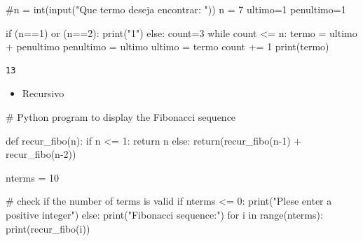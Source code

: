 \documentclass[
  letterpaper,
  DIV=11,
  numbers=noendperiod]{scrartcl}
\newenvironment{Shaded}{\begin{snugshade}}{\end{snugshade}}
\newcommand{\BuiltInTok}[1]{\textcolor[rgb]{0.00,0.23,0.31}{#1}}
\newcommand{\CommentTok}[1]{\textcolor[rgb]{0.37,0.37,0.37}{#1}}
\newcommand{\ControlFlowTok}[1]{\textcolor[rgb]{0.00,0.23,0.31}{#1}}
\newcommand{\DecValTok}[1]{\textcolor[rgb]{0.68,0.00,0.00}{#1}}
\newcommand{\KeywordTok}[1]{\textcolor[rgb]{0.00,0.23,0.31}{#1}}
\newcommand{\NormalTok}[1]{\textcolor[rgb]{0.00,0.23,0.31}{#1}}
\newcommand{\OperatorTok}[1]{\textcolor[rgb]{0.37,0.37,0.37}{#1}}
\newcommand{\StringTok}[1]{\textcolor[rgb]{0.13,0.47,0.30}{#1}}
\providecommand{\tightlist}{%
  \setlength{\itemsep}{0pt}\setlength{\parskip}{0pt}}\usepackage{longtable,booktabs,array}
\begin{document}
\begin{Shaded}
\begin{Highlighting}[]
\CommentTok{\#n = int(input("Que termo deseja encontrar: "))}
\NormalTok{n }\OperatorTok{=} \DecValTok{7}
\NormalTok{ultimo}\OperatorTok{=}\DecValTok{1}
\NormalTok{penultimo}\OperatorTok{=}\DecValTok{1}


\ControlFlowTok{if}\NormalTok{ (n}\OperatorTok{==}\DecValTok{1}\NormalTok{) }\KeywordTok{or}\NormalTok{ (n}\OperatorTok{==}\DecValTok{2}\NormalTok{):}
    \BuiltInTok{print}\NormalTok{(}\StringTok{"1"}\NormalTok{)}
\ControlFlowTok{else}\NormalTok{:}
\NormalTok{    count}\OperatorTok{=}\DecValTok{3}
    \ControlFlowTok{while}\NormalTok{ count }\OperatorTok{\textless{}=}\NormalTok{ n:}
\NormalTok{        termo }\OperatorTok{=}\NormalTok{ ultimo }\OperatorTok{+}\NormalTok{ penultimo}
\NormalTok{        penultimo }\OperatorTok{=}\NormalTok{ ultimo}
\NormalTok{        ultimo }\OperatorTok{=}\NormalTok{ termo}
\NormalTok{        count }\OperatorTok{+=} \DecValTok{1}
    \BuiltInTok{print}\NormalTok{(termo)}
\end{Highlighting}
\end{Shaded}

\begin{verbatim}
13
\end{verbatim}

\begin{itemize}
\tightlist
\item
  Recursivo
\end{itemize}

\begin{Shaded}
\begin{Highlighting}[]
\CommentTok{\# Python program to display the Fibonacci sequence}

\KeywordTok{def}\NormalTok{ recur\_fibo(n):}
   \ControlFlowTok{if}\NormalTok{ n }\OperatorTok{\textless{}=} \DecValTok{1}\NormalTok{:}
       \ControlFlowTok{return}\NormalTok{ n}
   \ControlFlowTok{else}\NormalTok{:}
       \ControlFlowTok{return}\NormalTok{(recur\_fibo(n}\OperatorTok{{-}}\DecValTok{1}\NormalTok{) }\OperatorTok{+}\NormalTok{ recur\_fibo(n}\OperatorTok{{-}}\DecValTok{2}\NormalTok{))}

\NormalTok{nterms }\OperatorTok{=} \DecValTok{10}

\CommentTok{\# check if the number of terms is valid}
\ControlFlowTok{if}\NormalTok{ nterms }\OperatorTok{\textless{}=} \DecValTok{0}\NormalTok{:}
   \BuiltInTok{print}\NormalTok{(}\StringTok{"Plese enter a positive integer"}\NormalTok{)}
\ControlFlowTok{else}\NormalTok{:}
   \BuiltInTok{print}\NormalTok{(}\StringTok{"Fibonacci sequence:"}\NormalTok{)}
   \ControlFlowTok{for}\NormalTok{ i }\KeywordTok{in} \BuiltInTok{range}\NormalTok{(nterms):}
       \BuiltInTok{print}\NormalTok{(recur\_fibo(i))}
\end{Highlighting}
\end{Shaded}
\end{document}
